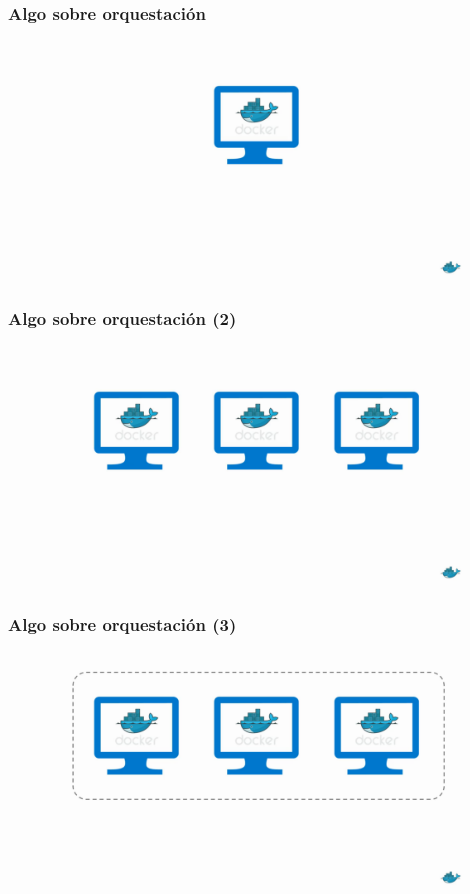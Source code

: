 \documentclass{beamer}
\begin{document}
\begin{frame}
	\frametitle{Algo sobre orquestación}
	\begin{figure}[htp]
	\centering
	\includegraphics[width=0.95\linewidth]{img/orquestacion_1.png}
	\end{figure}
\end{frame}

\begin{frame}
  \frametitle{Algo sobre orquestación (2)}
	\begin{figure}[htp]
	\centering
	\includegraphics[width=0.95\linewidth]{img/orquestacion_2.png}
	\end{figure}
\end{frame}


\begin{frame}
  \frametitle{Algo sobre orquestación (3)}
	\begin{figure}[htp]
	\centering
	\includegraphics[width=0.95\linewidth]{img/orquestacion_3.png}
	\end{figure}
\end{frame}
\end{document}
